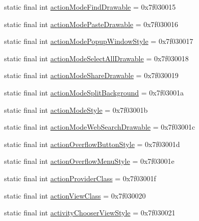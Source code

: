 \begin{DoxyCompactItemize}
static final int \mbox{\hyperlink{classandroid_1_1support_1_1v7_1_1appcompat_1_1R_1_1attr_a386de696bceb17018e1a23752a1cca0a}{action\+Mode\+Find\+Drawable}} = 0x7f030015
\item 
static final int \mbox{\hyperlink{classandroid_1_1support_1_1v7_1_1appcompat_1_1R_1_1attr_a7f7e6ffd10b94048d2aac78d14337331}{action\+Mode\+Paste\+Drawable}} = 0x7f030016
\item 
static final int \mbox{\hyperlink{classandroid_1_1support_1_1v7_1_1appcompat_1_1R_1_1attr_a9873917b9626a17f0f530aa4ee6ae0ab}{action\+Mode\+Popup\+Window\+Style}} = 0x7f030017
\item 
static final int \mbox{\hyperlink{classandroid_1_1support_1_1v7_1_1appcompat_1_1R_1_1attr_a643128ee6e0b39ab3a490d97a1bc2a1c}{action\+Mode\+Select\+All\+Drawable}} = 0x7f030018
\item 
static final int \mbox{\hyperlink{classandroid_1_1support_1_1v7_1_1appcompat_1_1R_1_1attr_a7f11cb5e5203407d71e651d923016ad3}{action\+Mode\+Share\+Drawable}} = 0x7f030019
\item 
static final int \mbox{\hyperlink{classandroid_1_1support_1_1v7_1_1appcompat_1_1R_1_1attr_a27e89a35d4e5b7a4522b59727f808ebb}{action\+Mode\+Split\+Background}} = 0x7f03001a
\item 
static final int \mbox{\hyperlink{classandroid_1_1support_1_1v7_1_1appcompat_1_1R_1_1attr_a1c138e650476ea7b80b937442308cb87}{action\+Mode\+Style}} = 0x7f03001b
\item 
static final int \mbox{\hyperlink{classandroid_1_1support_1_1v7_1_1appcompat_1_1R_1_1attr_a1bb0233f9691195dcca82e520fc9ab83}{action\+Mode\+Web\+Search\+Drawable}} = 0x7f03001c
\item 
static final int \mbox{\hyperlink{classandroid_1_1support_1_1v7_1_1appcompat_1_1R_1_1attr_ac44246b93fdaca5edd18dab65f8b7093}{action\+Overflow\+Button\+Style}} = 0x7f03001d
\item 
static final int \mbox{\hyperlink{classandroid_1_1support_1_1v7_1_1appcompat_1_1R_1_1attr_a4c4788cbdd5264d93ada23fbcda01b19}{action\+Overflow\+Menu\+Style}} = 0x7f03001e
\item 
static final int \mbox{\hyperlink{classandroid_1_1support_1_1v7_1_1appcompat_1_1R_1_1attr_ae5669dfd36f25313a003316d285651fa}{action\+Provider\+Class}} = 0x7f03001f
\item 
static final int \mbox{\hyperlink{classandroid_1_1support_1_1v7_1_1appcompat_1_1R_1_1attr_abfb8c0fa2a1c70398a977c91f3e8792d}{action\+View\+Class}} = 0x7f030020
\item 
static final int \mbox{\hyperlink{classandroid_1_1support_1_1v7_1_1appcompat_1_1R_1_1attr_a99ee319f70da8f853398a976e8aa77f1}{activity\+Chooser\+View\+Style}} = 0x7f030021

\end{DoxyCompactItemize}
